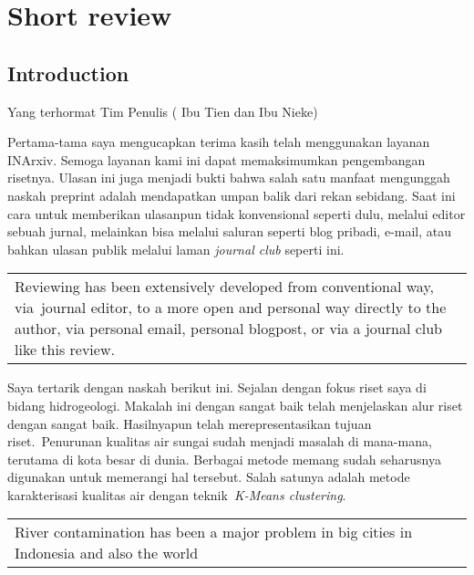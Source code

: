 \documentclass[10pt]{article}
\renewenvironment{quote}
  {\begin{tabular}{|p{13cm}}}
  {\end{tabular}}
\begin{document}
\section*{Short review}

{\label{419658}}

\subsection*{Introduction}

{\label{737266}}

Yang terhormat Tim Penulis ( Ibu Tien dan Ibu Nieke)~

\par\null

Pertama-tama saya mengucapkan terima kasih telah menggunakan layanan
INArxiv. Semoga layanan kami ini dapat memaksimumkan pengembangan
risetnya. Ulasan ini juga menjadi bukti bahwa salah satu manfaat
mengunggah naskah preprint adalah mendapatkan umpan balik dari rekan
sebidang. Saat ini cara untuk memberikan ulasanpun tidak konvensional
seperti dulu, melalui editor sebuah jurnal, melainkan bisa melalui
saluran seperti blog pribadi, e-mail, atau bahkan ulasan publik melalui
laman \emph{journal club} seperti ini.

\par\null

\begin{quote}
Reviewing has been extensively developed from conventional way,
via~journal editor, to a more open and personal way directly to the
author, via personal email, personal blogpost, or via a journal club
like this review.~ ~
\end{quote}

\par\null

Saya tertarik dengan naskah berikut ini. Sejalan dengan fokus riset saya
di bidang hidrogeologi. Makalah ini dengan sangat baik telah menjelaskan
alur riset dengan sangat baik. Hasilnyapun telah merepresentasikan
tujuan riset.~Penurunan kualitas air sungai sudah menjadi masalah di
mana-mana, terutama di kota besar di dunia. Berbagai metode memang sudah
seharusnya digunakan untuk memerangi hal tersebut. Salah satunya adalah
metode karakterisasi kualitas air dengan teknik~\emph{K-Means
clustering}.

\par\null

\begin{quote}
River contamination has been a major problem in big cities in Indonesia
and also the world
\end{quote}
\end{document}
